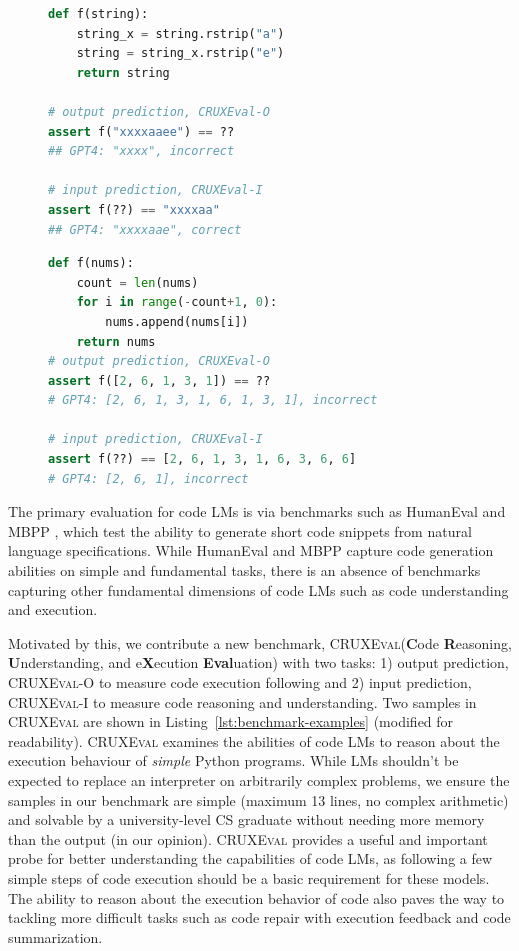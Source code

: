 \documentclass[twoside,11pt,preprint]{article}
\newcommand{\benchmark}{\textsc{CRUXEval}\xspace}
\newcommand{\benchmarki}{\textsc{CRUXEval-I}\xspace}
\newcommand{\benchmarko}{\textsc{CRUXEval-O}\xspace}
\begin{document}
\begin{figure}[t!]
\vspace{-1.5em}
\begin{lstlisting}[caption={},label={lst:benchmark-example1}, captionpos=t, breaklines=true, language=Python]
def f(string):
    string_x = string.rstrip("a")
    string = string_x.rstrip("e")
    return string

# output prediction, CRUXEval-O
assert f("xxxxaaee") == ??
## GPT4: "xxxx", incorrect

# input prediction, CRUXEval-I
assert f(??) == "xxxxaa"
## GPT4: "xxxxaae", correct
\end{lstlisting}

\begin{lstlisting}[caption={Sample problems},label={lst:benchmark-examples}, captionpos=b, breaklines=true, language=python]
def f(nums):
    count = len(nums)
    for i in range(-count+1, 0):
        nums.append(nums[i])
    return nums
# output prediction, CRUXEval-O
assert f([2, 6, 1, 3, 1]) == ??
# GPT4: [2, 6, 1, 3, 1, 6, 1, 3, 1], incorrect

# input prediction, CRUXEval-I
assert f(??) == [2, 6, 1, 3, 1, 6, 3, 6, 6]
# GPT4: [2, 6, 1], incorrect
\end{lstlisting}
\vspace{-.75em}
\end{figure}

The primary evaluation for code LMs is via benchmarks such as HumanEval \citep{chen2021evaluating} and MBPP \citep{austin2021program}, which test the ability to generate short code snippets from natural language specifications. While HumanEval and MBPP capture code generation abilities on simple and fundamental tasks, there is an absence of benchmarks capturing other fundamental dimensions of code LMs such as code understanding and execution.

Motivated by this, we contribute a new benchmark, \benchmark (\textbf{C}ode \textbf{R}easoning, \textbf{U}nderstanding, and e\textbf{X}ecution \textbf{Eval}uation) with two tasks: 1) output prediction, \benchmarko to measure code execution following and 2) input prediction, \benchmarki to measure code reasoning and understanding. Two samples in \benchmark are shown in Listing~\ref{lst:benchmark-examples} (modified for readability). \benchmark examines the abilities of code LMs to reason about the execution behaviour of \textit{simple} Python programs. While LMs shouldn't be expected to replace an interpreter on arbitrarily complex problems, we ensure the samples in our benchmark are simple (maximum 13 lines, no complex arithmetic) and solvable by a university-level CS graduate without needing more memory than the output (in our opinion). \benchmark provides a useful and important probe for better understanding the capabilities of code LMs, as following a few simple steps of code execution should be a basic requirement for these models. The ability to reason about the execution behavior of code also paves the way to tackling more difficult tasks such as code repair with execution feedback and code summarization.
\end{document}

